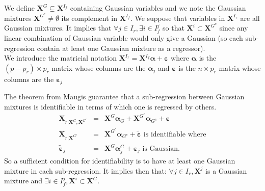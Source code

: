 \documentclass[12pt,a4paper]{report}
\begin{document}
	
We define $\boldsymbol{X}^G \subsetneq \boldsymbol{X}^{I_f}$ containing Gaussian variables and we note the Gaussian mixtures $\boldsymbol{X}^{G^c}\neq \emptyset$ its complement in $\boldsymbol{X}^{I_f}$.
We suppose that variables in $\boldsymbol{X}^{I_r}$ are all Gaussian mixtures. It implies that $\forall j  \in I_r,\exists i \in I_f^j $ so that $\boldsymbol{X}^i \subset \boldsymbol{X}^{G^c} $ since any linear combination of Gaussian variable would only give a Gaussian (so each sub-regression contain at least one Gaussian mixture as a regressor).
\\
	We introduce the matricial notation
		$\boldsymbol{X}^{I_r}=\boldsymbol{X}^{I_f}\boldsymbol{\alpha} + \boldsymbol{\varepsilon}$ where
		 $\boldsymbol{\alpha}$ is the $(p-p_r)\times p_r$ matrix whose columns are the $\boldsymbol{\alpha}_j$ and $\boldsymbol{\varepsilon}$ is the $n\times p_r$ matrix whose columns are the $\boldsymbol{\varepsilon}_j$
		
The theorem from Maugis guarantee that a sub-regression between Gaussian mixtures is identifiable in terms of which one is regressed by others.
		\begin{eqnarray}
		 \boldsymbol{X}_{r|\boldsymbol{X}^G,\boldsymbol{X}^{G^c}}&=& \boldsymbol{X}^G\boldsymbol{\alpha}_G+\boldsymbol{X}^{G^c}\boldsymbol{\alpha}_{G^c}+ \boldsymbol{\varepsilon} \\
			\boldsymbol{X}_{r|\boldsymbol{X}^{G^c}}&=& \boldsymbol{X}^{G^c}\boldsymbol{\alpha}_{G^c} + \tilde{\boldsymbol{\varepsilon}} \textrm{ is identifiable where} \\
			\tilde{\boldsymbol{\varepsilon}}_j&=&\boldsymbol{X}^{G}\boldsymbol{\alpha}_j^{G}+ \boldsymbol{\varepsilon}_j \textrm{ is Gaussian.}  
		\end{eqnarray}
		So a sufficient condition for identifiability is to have at least one Gaussian mixture in each sub-regression.	
		It implies then that: $\forall j \in I_r, \boldsymbol{X}^{j} $ is a Gaussian mixture and $\exists i \in I_f^j,\boldsymbol{X}^{i} \subset \boldsymbol{X}^G $.  \\
		
\end{document}

